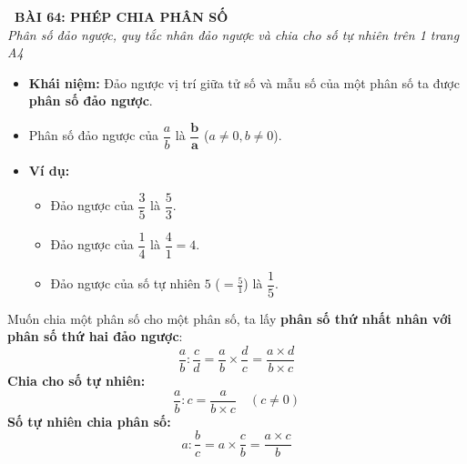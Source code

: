\documentclass[14pt,a4paper,oneside]{extbook}
\begin{document}
\noindent
\begin{tcolorbox}[
  enhanced,
  colback=teal!8!white,
  colframe=teal!80!black,
  arc=3mm, boxrule=1pt,
  left=3mm, right=3mm, top=2mm, bottom=2mm,
  halign=center
]
  {\Large\bfseries\color{teal!90!black}\faBookmark\ BÀI 64: PHÉP CHIA PHÂN SỐ}\\[1.5pt]
  {\footnotesize\itshape\color{black!75} Phân số đảo ngược, quy tắc nhân đảo ngược và chia cho số tự nhiên trên 1 trang A4}
\end{tcolorbox}

\vspace{-2.5mm}

\noindent
\begin{minipage}[t]{0.49\textwidth}\vspace{0pt}
\begin{tcolorbox}[
  enhanced,
  colback=blue!4!white,
  colframe=blue!75!black,
  arc=2mm, boxrule=0.8pt,
  left=2mm, right=2mm, top=1.8mm, bottom=1.8mm,
  title={\footnotesize\bfseries\color{white}\faRefresh\ 1. Phân số đảo ngược}
]
{\footnotesize
\begin{itemize}\setlength{\itemsep}{1pt}\setlength{\leftskip}{-2.5mm}
  \item \textbf{Khái niệm:} Đảo ngược vị trí giữa tử số và mẫu số của một phân số ta được \textbf{phân số đảo ngược}.
  \item Phân số đảo ngược của $\dfrac{a}{b}$ là $\mathbf{\dfrac{b}{a}}$ ($a \ne 0, b \ne 0$).
  \item \textbf{Ví dụ:}
  \begin{itemize}\setlength{\itemsep}{0.5pt}\setlength{\leftskip}{-2.5mm}
    \item Đảo ngược của $\dfrac{3}{5}$ là $\dfrac{5}{3}$.
    \item Đảo ngược của $\dfrac{1}{4}$ là $\dfrac{4}{1} = 4$.
    \item Đảo ngược của số tự nhiên $5$ ($=\frac{5}{1}$) là $\dfrac{1}{5}$.
  \end{itemize}
\end{itemize}
}
\end{tcolorbox}
\end{minipage}
\hfill
\begin{minipage}[t]{0.49\textwidth}\vspace{0pt}
\begin{tcolorbox}[
  enhanced,
  colback=teal!4!white,
  colframe=teal!75!black,
  arc=2mm, boxrule=0.8pt,
  left=2mm, right=2mm, top=1.8mm, bottom=1.8mm,
  title={\footnotesize\bfseries\color{white}\faShareAlt\ 2. Quy tắc chia phân số}
]
{\footnotesize
Muốn chia một phân số cho một phân số, ta lấy \textbf{phân số thứ nhất nhân với phân số thứ hai đảo ngược}:
$$\dfrac{a}{b} : \dfrac{c}{d} = \dfrac{a}{b} \times \dfrac{d}{c} = \dfrac{a \times d}{b \times c}$$
\textbf{Chia cho số tự nhiên:}\\
$$\dfrac{a}{b} : c = \dfrac{a}{b \times c} \quad (c \ne 0)$$
\textbf{Số tự nhiên chia phân số:}\\
$$a : \dfrac{b}{c} = a \times \dfrac{c}{b} = \dfrac{a \times c}{b}$$
}
\end{tcolorbox}
\end{minipage}
\end{document}
